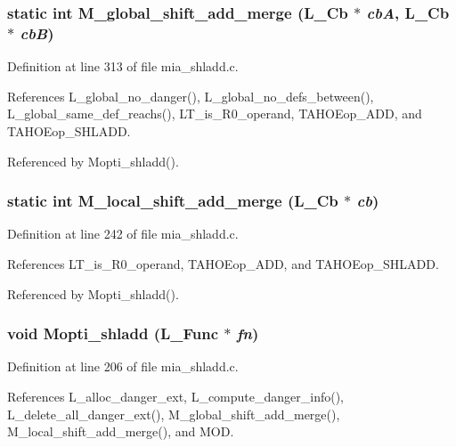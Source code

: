 \subsubsection{\setlength{\rightskip}{0pt plus 5cm}static int M\_\-global\_\-shift\_\-add\_\-merge (L\_\-Cb $\ast$ {\em cb\-A}, L\_\-Cb $\ast$ {\em cb\-B})\hspace{0.3cm}{\tt  [static]}}\label{mia__shladd_8c_a9d61f333746a1466931127f228aff26}




Definition at line 313 of file mia\_\-shladd.c.

References L\_\-global\_\-no\_\-danger(), L\_\-global\_\-no\_\-defs\_\-between(), L\_\-global\_\-same\_\-def\_\-reachs(), LT\_\-is\_\-R0\_\-operand, TAHOEop\_\-ADD, and TAHOEop\_\-SHLADD.

Referenced by Mopti\_\-shladd().
\subsubsection{\setlength{\rightskip}{0pt plus 5cm}static int M\_\-local\_\-shift\_\-add\_\-merge (L\_\-Cb $\ast$ {\em cb})\hspace{0.3cm}{\tt  [static]}}\label{mia__shladd_8c_d4b254622bd84ff523641dd56b2d27d2}




Definition at line 242 of file mia\_\-shladd.c.

References LT\_\-is\_\-R0\_\-operand, TAHOEop\_\-ADD, and TAHOEop\_\-SHLADD.

Referenced by Mopti\_\-shladd().
\subsubsection{\setlength{\rightskip}{0pt plus 5cm}void Mopti\_\-shladd (L\_\-Func $\ast$ {\em fn})}\label{mia__shladd_8c_3d5b5f62b487eb1cdb88601414214ef5}




Definition at line 206 of file mia\_\-shladd.c.

References L\_\-alloc\_\-danger\_\-ext, L\_\-compute\_\-danger\_\-info(), L\_\-delete\_\-all\_\-danger\_\-ext(), M\_\-global\_\-shift\_\-add\_\-merge(), M\_\-local\_\-shift\_\-add\_\-merge(), and MOD.